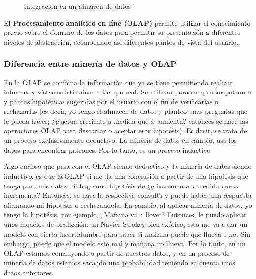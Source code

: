 \documentclass{article}
\begin{document}
\begin{figure}[H]
\caption{Integración en un almacén de datos}
\label{fig:data-warehouse}

\end{figure}

El \textbf{Procesamiento analítico en líne (OLAP)} permite utilizar el conocimiento previo sobre el dominio de los datos para permitir su presentación a diferentes niveles de abstracción, acomodando así diferentes puntos de vista del usuario.

\subsubsection{Diferencia entre minería de datos y OLAP}

En la OLAP se combina la información que ya se tiene permitiendo realizar informes y vistas sofisticadas en tiempo real. Se utilizan para comprobar patrones y pautas hipotéticas sugeridas por el usuario con el fin de verificarlas o rechazarlas (es decir, yo tengo el almacen de datos y planteo unas preguntas que le pueda hacer; ¿$y$ actúa creciente a medida que $x$ aumenta? entonces se hace las operaciones OLAP para descartar o aceptar esas hipotésis). Es decir, se trata de un proceso exclusivamente deductivo. La minería de datos en cambio, usa los datos para encontrar patrones. Por lo tanto, es un proceso inductivo


Algo curioso que pasa con el OLAP siendo deductivo y la minería de datos siendo inductivo, es que la OLAP sí me da una conclusión a partir de una hipotésis que tenga para mis datos. Si hago una hipotésis de ¿$y$ incrementa a medida que $x$ incrementa? Entonces, se hace la respectiva consulta y puede haber una respuesta afirmando mí hipotésis o rechazandola. En cambio, al aplicar minería de datos, yo tengo la hipotésis, por ejemplo, ¿Mañana va a llover? Entonces, le puedo aplicar unos modelos de predicción, un Navier-Strokes bien exótico, esto me va a dar un modelo con cierta incertidumbre para saber si mañana puede que llueva o no. Sin embargo, puede que el modelo esté mal y mañana no llueva. Por lo tanto, en un OLAP estamos concluyendo a partir de nuestros datos, y en un proceso de minería de datos estamos sacando una probabilidad teniendo en cuenta unos datos anteriores.
\end{document}
